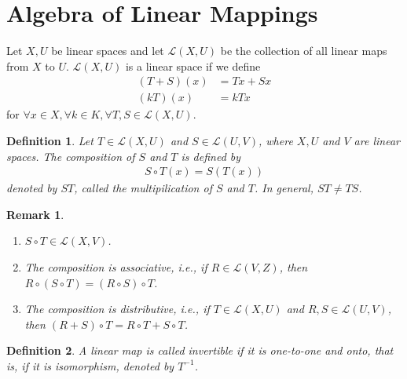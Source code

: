 \documentclass[11pt]{book}
\newtheorem{definition}{Definition}[section]
\newtheorem{remark}{Remark}[section]
\theoremstyle{definition}
\numberwithin{equation}{chapter}
\begin{document}
\medskip

\section{Algebra of Linear Mappings}
Let $X,U$ be linear spaces and let $\mathscr{L}(X,U)$ be the collection of all linear maps from $X$ to $U$. $\mathscr{L}(X,U)$ is a linear space if we define
\begin{align*}
    (T+S)(x) & = Tx + Sx \\
    (kT)(x) & = k T x
\end{align*}
for $\forall x\in X, \forall k\in K, \forall T,S\in \mathscr{L}(X,U)$.

\medskip

\begin{definition}
Let $T\in \mathscr{L}(X,U)$ and $S\in \mathscr{L}(U,V)$, where $X,U$ and $V$ are linear spaces. The composition of $S$ and $T$ is defined by 
\begin{align*}
    S \circ T(x) = S\left(T(x)\right)
\end{align*}
denoted by $ST$, called the multipilication of $S$ and $T$. In general, $ST\neq TS$.
\end{definition}
\begin{remark}
~\begin{enumerate}[label=(\arabic*)]
    \item $S\circ T \in \mathscr{L}(X,V)$.
    \item The composition is associative, i.e., if $R\in \mathscr{L}(V,Z)$, then $R\circ (S\circ T) = (R\circ S)\circ T$.
    \item The composition is distributive, i.e., if $T\in \mathscr{L}(X,U)$ and $R,S \in \mathscr{L}(U,V)$, then $(R+S)\circ T = R\circ T + S\circ T$.
\end{enumerate}
\end{remark}

\medskip

\begin{definition}
A linear map is called invertible if it is one-to-one and onto, that is, if it is isomorphism, denoted by $T^{-1}$.
\end{definition}

\medskip
\end{document}
